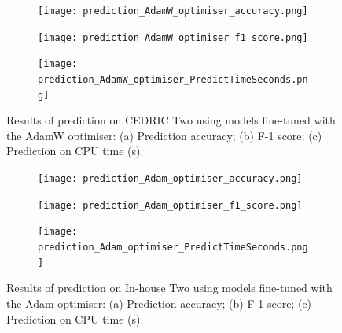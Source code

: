 \documentclass[a4paper,12pt]{article}
\newcommand{\figwidthh}{0.48\textwidth}
\newcommand{\inghamTwo}{CEDRIC Two\xspace}  %
\begin{document}
\begin{figure}[p]
	\begin{center}
		\begin{subfigure}[b]{\figwidthh}
			\caption{} 
			\texttt{[image: prediction\_AdamW\_optimiser\_accuracy.png]}
		\end{subfigure}
        \hfill
		\begin{subfigure}[b]{\figwidthh}
			\caption{}
			\texttt{[image: prediction\_AdamW\_optimiser\_f1\_score.png]}
		\end{subfigure}
        \hfill
		\begin{subfigure}[b]{\figwidthh}
			\caption{}
			\texttt{[image: prediction\_AdamW\_optimiser\_PredictTimeSeconds.png]}
		\end{subfigure}
	\end{center}
	\caption{Results of prediction on \inghamTwo using models fine-tuned with the AdamW optimiser: (a) Prediction accuracy; (b) F-1 score; (c) Prediction on CPU time (s). 
	} 
	\label{fig:res_predict_adamW}
\end{figure}

\begin{figure}[p] 
	\begin{center}
		\begin{subfigure}[b]{\figwidthh}
			\caption{} 
			\texttt{[image: prediction\_Adam\_optimiser\_accuracy.png]}
		\end{subfigure}
        \hfill
		\begin{subfigure}[b]{\figwidthh}
			\caption{}
			\texttt{[image: prediction\_Adam\_optimiser\_f1\_score.png]}
		\end{subfigure}
        \hfill
		\begin{subfigure}[b]{\figwidthh}
			\caption{}
			\texttt{[image: prediction\_Adam\_optimiser\_PredictTimeSeconds.png]}
		\end{subfigure}
	\end{center}
	\caption{Results of prediction on In-house Two using models fine-tuned with the Adam optimiser: 
	(a) Prediction accuracy; (b) F-1 score; (c) Prediction on CPU time (s).
	} 
	\label{fig:res_prdict_adam}
\end{figure}
\end{document}
